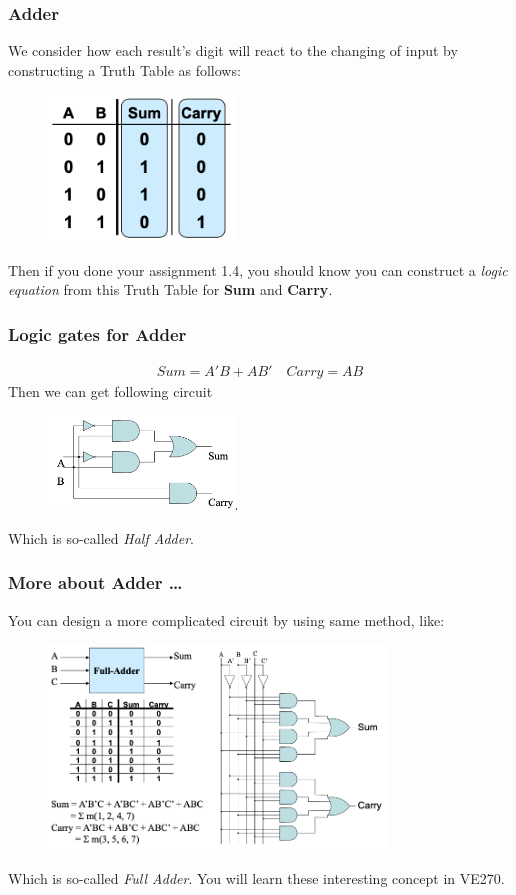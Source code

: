 \documentclass[12pt, t]{beamer}
\renewcommand{\emph}[1]{{\color{Turquoise3}\textsl{#1}}}
\begin{document}
\begin{frame}
    \frametitle{Adder}
    We consider how each result's digit will react to the changing of input by constructing a Truth Table as follows:
    \begin{figure}
        \centering
        \includegraphics[width=5cm]{Figures/Adder_T.png}
    \end{figure}
    Then if you done your assignment 1.4, you should know you can construct a \emph{logic equation} from this Truth Table for \textbf{Sum} and \textbf{Carry}.\\
\end{frame}


\begin{frame}
    \frametitle{Logic gates for Adder}
    \begin{align*}
        Sum=A'B+AB' \quad Carry=AB
    \end{align*}
    Then we can get following circuit
    \begin{figure}
        \centering
        \includegraphics[width=5cm]{Figures/HalfAdder.png}
    \end{figure}
    Which is so-called \emph{Half Adder}.
\end{frame}

\begin{frame}
    \frametitle{More about Adder \dots}
    You can design a more complicated circuit by using same method, like:
    \begin{figure}
        \centering
        \includegraphics[width=9cm]{Figures/FullAdder.png}
    \end{figure}
    Which is so-called \emph{Full Adder}. You will learn these interesting concept in VE270.
\end{frame}
\end{document}
